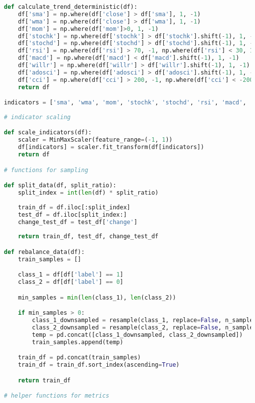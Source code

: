 \begin{lstlisting}[language=Python]
def calculate_trend_deterministic(df):
    df['sma'] = np.where(df['close'] > df['sma'], 1, -1)
    df['wma'] = np.where(df['close'] > df['wma'], 1, -1)
    df['mom'] = np.where(df['mom']>0, 1, -1)
    df['stochk'] = np.where(df['stochk'] > df['stochk'].shift(-1), 1, -1)
    df['stochd'] = np.where(df['stochd'] > df['stochd'].shift(-1), 1, -1)
    df['rsi'] = np.where(df['rsi'] > 70, -1, np.where(df['rsi'] < 30, 1, np.where(df['rsi'] < df['rsi'].shift(1), 1, -1)))
    df['macd'] = np.where(df['macd'] < df['macd'].shift(-1), 1, -1)
    df['willr'] = np.where(df['willr'] > df['willr'].shift(-1), 1, -1)
    df['adosci'] = np.where(df['adosci'] > df['adosci'].shift(-1), 1, -1)
    df['cci'] = np.where(df['cci'] > 200, -1, np.where(df['cci'] < -200, 1, np.where(df['cci'] < df['cci'].shift(1), 1, -1)))
    return df

indicators = ['sma', 'wma', 'mom', 'stochk', 'stochd', 'rsi', 'macd', 'willr', 'adosci', 'cci']
    
# indicator scaling

def scale_indicators(df):
    scaler = MinMaxScaler(feature_range=(-1, 1))
    df[indicators] = scaler.fit_transform(df[indicators])
    return df

# functions for sampling

def split_data(df, split_ratio):
    split_index = int(len(df) * split_ratio)
    
    train_df = df.iloc[:split_index]
    test_df = df.iloc[split_index:]
    change_test_df = test_df['change']
    
    return train_df, test_df, change_test_df

def rebalance_data(df):
    train_samples = []

    class_1 = df[df['label'] == 1]
    class_2 = df[df['label'] == 0]

    min_samples = min(len(class_1), len(class_2))

    if min_samples > 0:
        class_1_downsampled = resample(class_1, replace=False, n_samples=min_samples, random_state=42)
        class_2_downsampled = resample(class_2, replace=False, n_samples=min_samples, random_state=42)
        temp = pd.concat([class_1_downsampled, class_2_downsampled])
        train_samples.append(temp)

    train_df = pd.concat(train_samples)
    train_df = train_df.sort_index(ascending=True)

    return train_df

# helper functions for metrics


\end{lstlisting}

